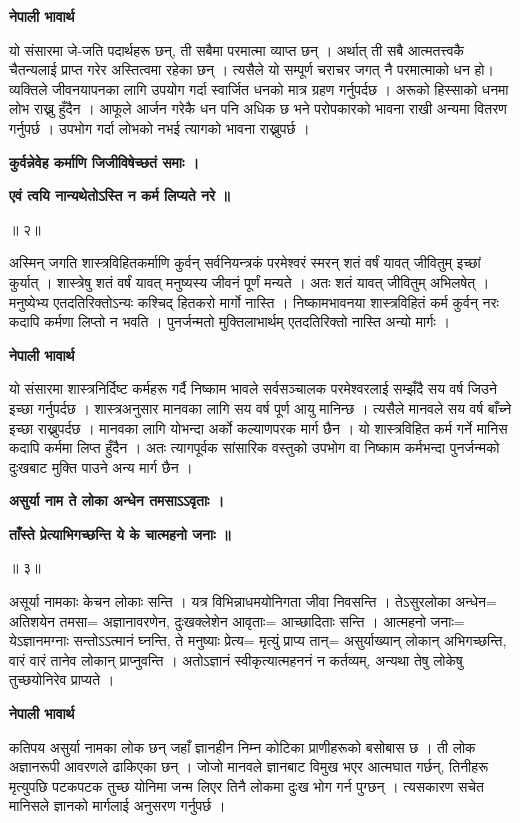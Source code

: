 \documentclass[11pt, a5paper]{article}
\begin{document}
\textbf{नेपाली भावार्थ}

यो संसारमा जे-जति पदार्थहरू छन्, ती सबैमा परमात्मा व्याप्त छन् । अर्थात् ती सबै आत्मतत्त्वकै चैतन्यलाई प्राप्त गरेर अस्तित्वमा रहेका छन् । त्यसैले यो सम्पूर्ण चराचर जगत् नै परमात्माको धन हो। व्यक्तिले जीवनयापनका लागि उपयोग गर्दा स्वार्जित धनको मात्र ग्रहण गर्नुपर्दछ । अरूको हिस्साको धनमा लोभ राख्नु हुँदैन । आफूले आर्जन गरेकै धन पनि अधिक छ भने परोपकारको भावना राखी अन्यमा वितरण गर्नुपर्छ । उपभोग गर्दा लोभको नभई त्यागको भावना राख्नुपर्छ ।

\textbf{कुर्वन्नेवेह कर्माणि जिजीविषेच्छतं समाः ।}

\textbf{एवं त्वयि नान्यथेतोऽस्ति न कर्म लिप्यते नरे ॥}

॥ २॥

अस्मिन् जगति शास्त्रविहितकर्माणि कुर्वन् सर्वनियन्त्रकं परमेश्वरं स्मरन् शतं वर्षं यावत् जीवितुम् इच्छां कुर्यात् । शास्त्रेषु शतं वर्षं यावत् मनुष्यस्य जीवनं पूर्णं मन्यते । अतः शतं यावत् जीवितुम् अभिलषेत् । मनुष्येभ्य एतदतिरिक्तोऽन्यः कश्चिद्‌ हितकरो मार्गो नास्ति । निष्कामभावनया शास्त्रविहितं कर्म कुर्वन् नरः कदापि कर्मणा लिप्तो न भवति । पुनर्जन्मतो मुक्तिलाभार्थम् एतदतिरिक्तो नास्ति अन्यो मार्गः ।

\textbf{नेपाली भावार्थ}

यो संसारमा शास्त्रनिर्दिष्ट कर्महरू गर्दै निष्काम भावले सर्वसञ्चालक परमेश्वरलाई सम्झँदै सय वर्ष जिउने इच्छा गर्नुपर्दछ । शास्त्रअनुसार मानवका लागि सय वर्ष पूर्ण आयु मानिन्छ । त्यसैले मानवले सय वर्ष बाँच्ने इच्छा राख्नुपर्दछ । मानवका लागि योभन्दा अर्को कल्याणपरक मार्ग छैन । यो शास्त्रविहित कर्म गर्ने मानिस कदापि कर्ममा लिप्त हुँदैन । अतः त्यागपूर्वक सांसारिक वस्तुको उपभोग वा निष्काम कर्मभन्दा पुनर्जन्मको दुःखबाट मुक्ति पाउने अन्य मार्ग छैन ।

\textbf{असुर्या नाम ते लोका अन्धेन तमसाऽऽवृताः ।}

\textbf{ताँस्ते प्रेत्याभिगच्छन्ति ये के चात्महनो जनाः ॥}

॥ ३॥

असूर्या नामकाः केचन लोकाः सन्ति । यत्र विभिन्नाधमयोनिगता जीवा निवसन्ति । तेऽसुरलोका अन्धेन= अतिशयेन तमसा= अज्ञानावरणेन, दुःखक्लेशेन आवृताः= आच्छादिताः सन्ति । आत्महनो जनाः‍= येऽज्ञानमग्नाः सन्तोऽऽत्मानं घ्नन्ति, ते मनुष्याः प्रेत्य= मृत्युं प्राप्य तान्= असुर्याख्यान् लोकान् अभिगच्छन्ति, वारं वारं तानेव लोकान् प्राप्नुवन्ति । अतोऽज्ञानं स्वीकृत्यात्महननं न कर्तव्यम्, अन्यथा तेषु लोकेषु तुच्छयोनिरेव प्राप्यते ।

\textbf{नेपाली भावार्थ}

कतिपय असुर्या नामका लोक छन् जहाँ ज्ञानहीन निम्न कोटिका प्राणीहरूको बसोबास छ । ती लोक अज्ञानरूपी आवरणले ढाकिएका छन् । जोजो मानवले ज्ञानबाट विमुख भएर आत्मघात गर्छन्, तिनीहरू मृत्युपछि पटकपटक तुच्छ योनिमा जन्म लिएर तिनै लोकमा दुःख भोग गर्न पुग्छन् । त्यसकारण सचेत मानिसले ज्ञानको मार्गलाई अनुसरण गर्नुपर्छ ।
\end{document}
